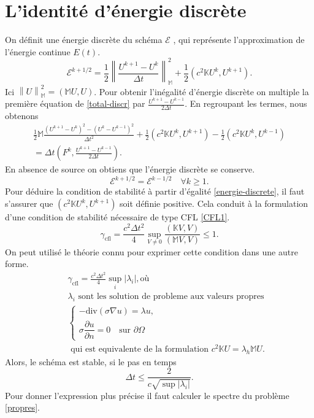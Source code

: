 \documentclass[12pt]{article}
\newcommand\norm[1]{\left\lVert#1\right\rVert}
\newcommand{\pd}[2]{ %
	\dfrac{\partial #1}{\partial #2}
}
\begin{document}
\section{L'identité d'énergie discrète}
On définit une énergie discrète du schéma $\mathcal{E}$ , qui représente l'approximation de l'énergie continue $E(t)$.
\begin{equation}
	\mathcal{E}^{k + 1/2} = \frac{1}{2}\norm{\frac{U^{k+1} - U^k}{\Delta t}}_\mathbb{M}^2 + \frac{1}{2}(c^2\mathbb{K}U^k, U^{k+1}).
\end{equation}
Ici $\norm{U}_\mathbb{M}^2 = (\mathbb{M}U,U)$. Pour obtenir l'inégalité d'énergie discrète on multiple la première équation de \eqref{total-discr} par $\frac{U^{k+1} - U^{k - 1}}{2\Delta t}$. En regroupant les termes, nous obtenons
\begin{multline}
	\frac{1}{2}\mathbb{M}\frac{(U^{k+1} - U^k)^2 - (U^k - U^{k-1})^2}{\Delta t^2} + \frac{1}{2}(c^2\mathbb{K}U^k, U^{k+1}) - \frac{1}{2}(c^2\mathbb{K}U^{k}, U^{k-1}) \\= \Delta t(F^k, \frac{U^{k+1} - U^{k - 1}}{2\Delta t}).
\end{multline}
En absence de source on obtiens que l'énergie discrète se conserve.
\begin{equation}
\label{energie-discrete}
	\mathcal{E}^{k +1/2} = \mathcal{E}^{k - 1/2} \quad \forall k \geq 1.
\end{equation}
Pour déduire la condition de stabilité à partir d'égalité \eqref{energie-discrete}, il faut s'assurer que $(c^2\mathbb{K}U^k, U^{k+1})$ soit définie positive. Cela conduit à la formulation d'une condition de stabilité nécessaire de type CFL \eqref{CFL1}.
\begin{equation}
\label{CFL1}
\gamma_{\text{cfl}} = \frac{c^2 \Delta t^2}{4}\sup_{V \neq 0} \frac{(\mathbb{K}V, V)}{(\mathbb{M}V, V)} \leq 1.
\end{equation}
On peut utilisé le théorie connu pour exprimer cette condition dans une autre forme.
\begin{eqnarray}
	& &\gamma_{\text{cfl}} = \frac{c^2 \Delta t^2}{4} \sup_i|\lambda_i|, \text{où}\\
	\nonumber
	& &\lambda_i \text{ sont les solution de probleme aux valeurs propres}\\
	\label{propres}
	& &\begin{cases}
	-\text{div}(\sigma\nabla u ) = \lambda u,\\
	\sigma \pd{u}{n} = 0 \quad \text{sur } \partial\Omega
	\end{cases} \\
		\nonumber
	& &\text{ qui est equivalente de la formulation } c^2\mathbb{K}U = \lambda_h \mathbb{M}U.
\end{eqnarray}
Alors, le schéma est stable, si le pas en temps 
\begin{equation}
\label{CFL}
\Delta t \leq \frac{2}{c \sqrt{\sup |\lambda_i|}}.
\end{equation}
Pour donner l'expression plus précise il faut calculer le spectre du problème \eqref{propres}.
\end{document}
